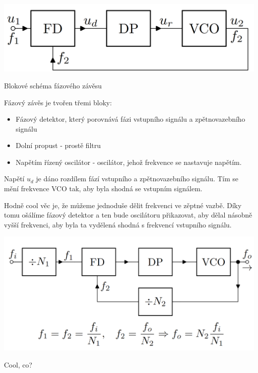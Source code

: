 \documentclass[a4paper,12pt]{article}   %
\begin{document}
\begin{schema}[h!]
    \centering
    \includegraphics[width=.6\textwidth]{fazovy_zaves.PNG}
    \caption{Blokové schéma fázového závěsu}
    \label{sch:faz:zaves}
\end{schema}

Fázový závěs je tvořen třemi bloky:
\begin{itemize}
    \item Fázový detektor, který porovnává fázi vstupního signálu a zpětnovazebního signálu
    \item Dolní propust - prostě filtru
    \item Napětím řízený oscilátor - oscilátor, jehož frekvence se nastavuje napětím.
\end{itemize}

Napětí $u_d$ je dáno rozdílem fází vstupního a zpětnovazebního signálu. Tím se mění frekvence VCO tak, aby byla shodná se vstupním signálem.

Hodně cool věc je, že můžeme jednoduše dělit frekvenci ve zěptné vazbě. Díky tomu ošálíme fázový detektor a ten bude oscilátoru přikazovat, aby dělal násobně vyšší frekvenci, aby byla ta vydělená shodná s frekvencí vstupního signálu.

\begin{graf}[h!]
    \centering
    \includegraphics[width = .6\textwidth]{fazovy_zaves-deleni.PNG}
\end{graf}
Cool, co?
\end{document}
